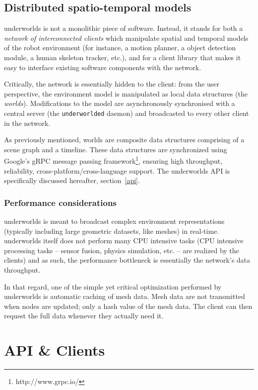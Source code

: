 \documentclass[letterpaper, 10 pt, conference]{ieeeconf}  %
\newcommand{\uwds}{{\sc underworlds}\xspace}
\begin{document}
\subsection{Distributed spatio-temporal models}
\label{arch}

\uwds is not a monolithic piece of software. Instead, it stands for both a
\emph{network of interconnected clients} which manipulate spatial and temporal
models of the robot environment (for instance, a motion planner, a object
detection module, a human skeleton tracker, etc.), and for a {client library}
that makes it easy to interface existing software components with the network.

Critically, the network is essentially hidden to the client: from the user
perspective, the environment model is manipulated as local data structures (the
\emph{worlds}). Modifications to the model are asynchronously synchronised with
a central server (the {\tt underworlded} daemon) and broadcasted to every other
client in the network.

As previously mentioned, worlds are composite data structures comprising of a
scene graph and a timeline. These data structures are synchronized using
Google's gRPC message passing framework\footnote{http://www.grpc.io/}, ensuring
high throughput, reliability, cross-platform/cross-language support. The \uwds
API is specifically discussed hereafter, section~\ref{api}.


\subsubsection*{Performance considerations}

\uwds is meant to broadcast complex environment representations (typically
including large geometric datasets, like meshes) in real-time. \uwds itself does
not perform many CPU intensive tasks (CPU intensive processing tasks -- sensor fusion, physics
simulation, etc. -- are realized by the clients) and as such, the performance
bottleneck is essentially the network's data throughput.

In that regard, one of the simple yet critical optimization performed by \uwds
is automatic caching of mesh data. Mesh data are not transmitted when nodes are
updated; only a hash value of the mesh data. The client can then request the
full data whenever they actually need it.



\section{API \& Clients}
\end{document}
